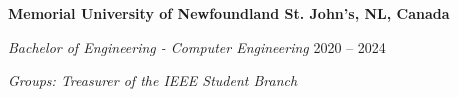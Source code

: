 \textbf{Memorial University of Newfoundland \hfill St. John's, NL, Canada} \par
\textit{Bachelor of Engineering - Computer Engineering} \hfill 2020 -- 2024\par
\textit{Groups: Treasurer of the IEEE Student Branch}